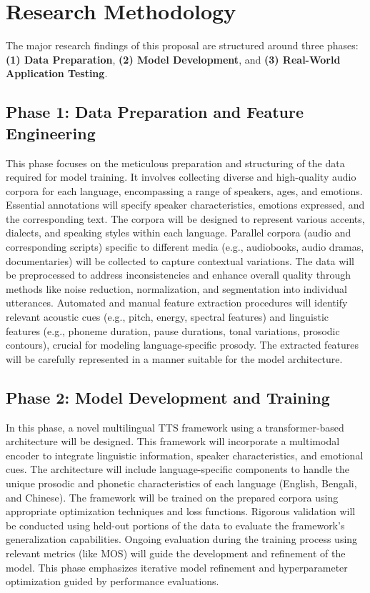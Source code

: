 \section*{Research Methodology}

The major research findings of this proposal are structured around three phases:  \textbf{(1) Data Preparation}, \textbf{(2) Model Development}, and \textbf{(3) Real-World Application Testing}.


\subsection*{Phase 1: Data Preparation and Feature Engineering}
This phase focuses on the meticulous preparation and structuring of the data required for model training. It involves collecting diverse and high-quality audio corpora for each language, encompassing a range of speakers, ages, and emotions. Essential annotations will specify speaker characteristics, emotions expressed, and the corresponding text. The corpora will be designed to represent various accents, dialects, and speaking styles within each language. Parallel corpora (audio and corresponding scripts) specific to different media (e.g., audiobooks, audio dramas, documentaries) will be collected to capture contextual variations. The data will be preprocessed to address inconsistencies and enhance overall quality through methods like noise reduction, normalization, and segmentation into individual utterances. Automated and manual feature extraction procedures will identify relevant acoustic cues (e.g., pitch, energy, spectral features) and linguistic features (e.g., phoneme duration, pause durations, tonal variations, prosodic contours), crucial for modeling language-specific prosody. The extracted features will be carefully represented in a manner suitable for the model architecture.

\subsection*{Phase 2: Model Development and Training}
In this phase, a novel multilingual TTS framework using a transformer-based architecture will be designed. This framework will incorporate a multimodal encoder to integrate linguistic information, speaker characteristics, and emotional cues. The architecture will include language-specific components to handle the unique prosodic and phonetic characteristics of each language (English, Bengali, and Chinese). The framework will be trained on the prepared corpora using appropriate optimization techniques and loss functions. Rigorous validation will be conducted using held-out portions of the data to evaluate the framework's generalization capabilities. Ongoing evaluation during the training process using relevant metrics (like MOS) will guide the development and refinement of the model. This phase emphasizes iterative model refinement and hyperparameter optimization guided by performance evaluations.

